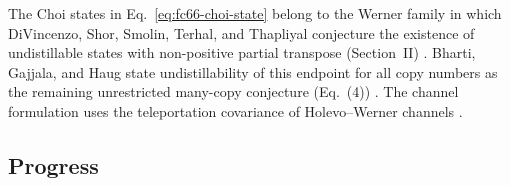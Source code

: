The Choi states in Eq.~\eqref{eq:fc66-choi-state} belong to the Werner family
in which DiVincenzo, Shor, Smolin, Terhal, and Thapliyal conjecture the
existence of undistillable states with non-positive partial transpose
(Section~II) .  Bharti,
Gajjala, and Haug state undistillability of this endpoint for all copy
numbers as the remaining unrestricted many-copy conjecture (Eq.~(4))
.  The channel formulation uses the
teleportation covariance of Holevo--Werner channels
.

\subsection*{Progress}

